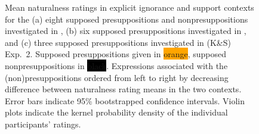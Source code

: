 \documentclass[11pt,fleqn]{article}
\newcommand{\6}{\mbox{$[\hspace*{-.6mm}[$}}
\newcommand{\9}{\mbox{$]\hspace*{-.6mm}]$}}
\begin{document}
\begin{figure}[h!]
%

\caption{Mean naturalness ratings in explicit ignorance and support contexts for the (a)  eight supposed presuppositions and nonpresuppositions investigated in \citealt[Exp.~3]{mandelkern-etal2020}, (b) six supposed presuppositions investigated in \citealt[Exp.~1]{kalomoiros-schwarz2024}, and (c) three supposed presuppositions investigated in \citealt{kalomoiros-schwarz2024} (K\&S) Exp.~2. Supposed presuppositions given in \colorbox{orange}{\color{white}orange\color{black}}, supposed nonpresuppositions in \colorbox{black}{\color{white}black\color{black}}. Expressions associated with the (non)presuppositions ordered from left to right by decreasing difference between naturalness rating means in the two contexts. Error bars indicate 95\% bootstrapped confidence intervals. Violin plots indicate the kernel probability density of the individual participants' ratings.}\label{fig:both-contexts}
\end{figure}
\end{document}
